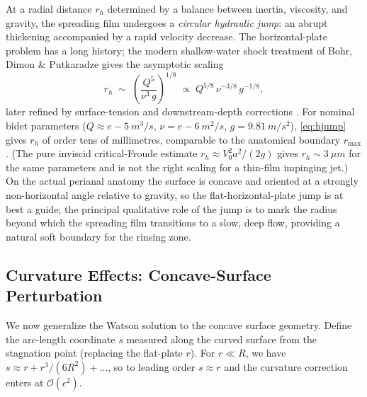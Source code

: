 \documentclass[10pt,letterpaper]{article}
\begin{document}
At a radial distance $r_h$ determined by a balance between inertia,
viscosity, and gravity, the spreading film undergoes a \emph{circular
hydraulic jump}: an abrupt thickening accompanied by a rapid velocity
decrease. The horizontal-plate problem has a long history; the modern
shallow-water shock treatment of Bohr, Dimon \& Putkaradze
\citep{BohrEtAl1993} gives the asymptotic scaling
\begin{equation}
    r_h \;\sim\; \left(\frac{Q^5}{\nu^3\,g}\right)^{1/8}
    \;\propto\; Q^{5/8}\,\nu^{-3/8}\,g^{-1/8},
    \label{eq:hjump}
\end{equation}
later refined by surface-tension and downstream-depth corrections
\citep{BushAristoff2003}. For nominal bidet parameters
($Q \approx e-5~m^3/s$, $\nu = e-6~m^2/s$,
$g = 9.81~m/s^2$), \eqref{eq:hjump} gives $r_h$ of order tens of
millimetres, comparable to the anatomical boundary $r_\mathrm{max}$.
(The pure inviscid critical-Froude estimate $r_h \approx V_0^2 a^2/(2g)$
gives $r_h \sim 3~\mu  m$ for the same parameters and is not the
right scaling for a thin-film impinging jet.)
On the actual perianal anatomy the surface is concave and
oriented at a strongly non-horizontal angle relative to gravity, so
the flat-horizontal-plate jump is at best a guide; the principal
qualitative role of the jump is to mark the radius beyond which the
spreading film transitions to a slow, deep flow, providing a natural
soft boundary for the rinsing zone.

\subsection{Curvature Effects: Concave-Surface Perturbation}
\label{subsec:curvature}

We now generalize the Watson solution to the concave surface geometry.
Define the arc-length coordinate $s$ measured along the curved surface from
the stagnation point (replacing the flat-plate $r$). For $r \ll R$, we have
$s \approx r + r^3/(6R^2) + \ldots$, so to leading order $s \approx r$ and
the curvature correction enters at $\mathcal{O}(\epsilon^2)$.
\end{document}

